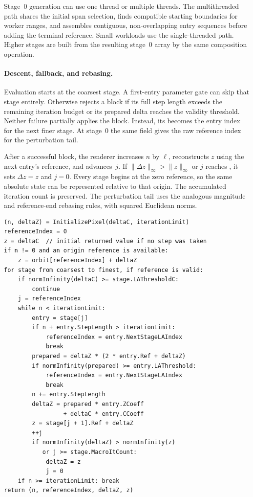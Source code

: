 Stage~0 generation can use one thread or multiple threads. The
multithreaded path shares the initial span selection, finds compatible
starting boundaries for worker ranges, and assembles contiguous,
non-overlapping entry sequences before adding the terminal reference.
Small workloads use the single-threaded path. Higher stages are built
from the resulting stage~0 array by the same composition operation.

\paragraph{Descent, fallback, and rebasing.}
Evaluation starts at the coarsest stage. A first-entry parameter gate
can skip that stage entirely. Otherwise  rejects a block
if its full step length exceeds the remaining iteration budget or
its prepared delta reaches the validity threshold. Neither failure
partially applies the block. Instead, its 
becomes the entry index for the next finer stage. At stage~0 the same
field gives the raw reference index for the perturbation tail.

After a successful block, the renderer increases $n$ by $\ell$,
reconstructs $z$ using the next entry's reference, and advances~$j$.
If $\lVert\Delta z\rVert_\infty>\lVert z\rVert_\infty$ or $j$ reaches
, it sets $\Delta z=z$ and $j=0$. Every stage begins
at the zero reference, so the same absolute state can be represented
relative to that origin. The accumulated iteration count is preserved.
The perturbation tail uses the analogous magnitude and reference-end
rebasing rules, with squared Euclidean norms.

\begin{lstlisting}[float=htbp,caption={Shared per-pixel AT and LA traversal},label={lst:la-traversal}]
(n, deltaZ) = InitializePixel(deltaC, iterationLimit)
referenceIndex = 0
z = deltaC  // initial returned value if no step was taken
if n != 0 and an origin reference is available:
    z = orbit[referenceIndex] + deltaZ
for stage from coarsest to finest, if reference is valid:
    if normInfinity(deltaC) >= stage.LAThresholdC:
        continue
    j = referenceIndex
    while n < iterationLimit:
        entry = stage[j]
        if n + entry.StepLength > iterationLimit:
            referenceIndex = entry.NextStageLAIndex
            break
        prepared = deltaZ * (2 * entry.Ref + deltaZ)
        if normInfinity(prepared) >= entry.LAThreshold:
            referenceIndex = entry.NextStageLAIndex
            break
        n += entry.StepLength
        deltaZ = prepared * entry.ZCoeff
                 + deltaC * entry.CCoeff
        z = stage[j + 1].Ref + deltaZ
        ++j
        if normInfinity(deltaZ) > normInfinity(z)
           or j >= stage.MacroItCount:
            deltaZ = z
            j = 0
    if n >= iterationLimit: break
return (n, referenceIndex, deltaZ, z)
\end{lstlisting}

